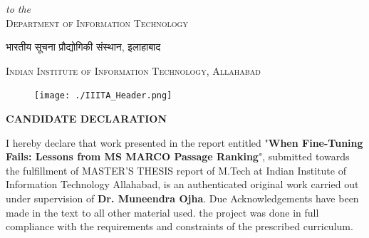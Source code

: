 \begin{titlepage}
\begin{center}
\begin{spacing}{1.2}
\vspace{7mm}
\textit{to the}\\[2mm]
\textsc{\Large Department of Information Technology}\\ %

\vspace{8mm}
\begin{otherlanguage}{hindi}
    {\Large भारतीय सूचना प्रौद्योगिकी संस्थान, इलाहाबाद} \\
\end{otherlanguage}
\vspace{3mm}
\textsc{\Large Indian Institute of Information Technology, Allahabad} %

\vspace{5mm}
{\fontsize{14}{14}\selectfont {}}

\end{spacing}
\end{center}
\end{titlepage}

\checktoopen
\begin{figure}[htp]
    \texttt{[image: ./IIITA\_Header.png]}
\end{figure}
\thispagestyle{empty}
\vspace{1mm}

\begin{center}
    {\large\bfseries CANDIDATE DECLARATION}
\end{center}

\begin{spacing}{1.5}
\vspace{10 pt}
I hereby declare that work presented in the report entitled "\textbf{When Fine-Tuning Fails: Lessons from MS MARCO Passage Ranking}", submitted towards the fulfillment of MASTER'S THESIS report of M.Tech at Indian Institute of Information Technology Allahabad, is an authenticated original work carried out under supervision of \textbf{Dr. Muneendra Ojha}. Due Acknowledgements have been made in the text to all other material used. the project was done in full compliance with the requirements and constraints of the prescribed curriculum. 
\end{spacing}

